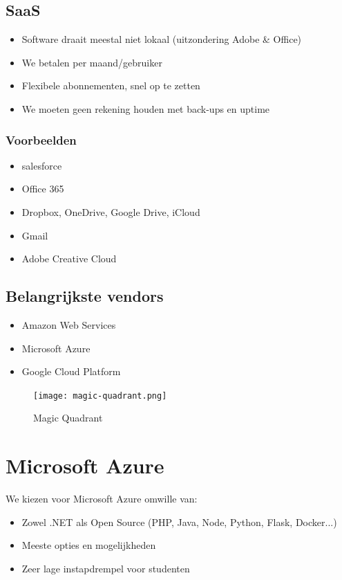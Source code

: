 \documentclass{article}
\begin{document}
\subsection{SaaS}
\begin{itemize}
    \item Software draait meestal niet lokaal (uitzondering Adobe \& Office)
    \item We betalen per maand/gebruiker
    \item Flexibele abonnementen, snel op te zetten
    \item We moeten geen rekening houden met back-ups en uptime
\end{itemize}

\subsubsection{Voorbeelden}
\begin{itemize}
    \item salesforce
    \item Office 365
    \item Dropbox, OneDrive, Google Drive, iCloud
    \item Gmail
    \item Adobe Creative Cloud
\end{itemize}

\subsection{Belangrijkste vendors}
\begin{itemize}
    \item Amazon Web Services
    \item Microsoft Azure
    \item Google Cloud Platform
\end{itemize}

\begin{figure}[H]
    \centering
    \texttt{[image: magic-quadrant.png]}
    \caption{Magic Quadrant}
\end{figure}



\section{Microsoft Azure}
We kiezen voor Microsoft Azure omwille van:
\begin{itemize}
    \item Zowel .NET als Open Source (PHP, Java, Node, Python, Flask, Docker...)
    \item Meeste opties en mogelijkheden
    \item Zeer lage instapdrempel voor studenten
\end{itemize}
\end{document}
